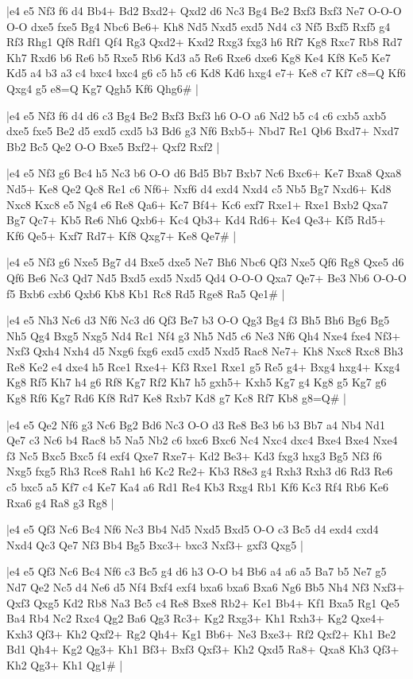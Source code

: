 \whitename{}
\blackname{}
\makegametitle
|e4 e5 Nf3 f6 d4 Bb4+ Bd2 Bxd2+ Qxd2 d6 Nc3 Bg4 Be2 Bxf3 Bxf3 Ne7 O-O-O O-O dxe5 fxe5 Bg4 Nbc6 Be6+ Kh8 Nd5 Nxd5 exd5 Nd4 c3 Nf5 Bxf5 Rxf5 g4 Rf3 Rhg1 Qf8 Rdf1 Qf4 Rg3 Qxd2+ Kxd2 Rxg3 fxg3 h6 Rf7 Kg8 Rxc7 Rb8 Rd7 Kh7 Rxd6 b6 Re6 b5 Rxe5 Rb6 Kd3 a5 Re6 Rxe6 dxe6 Kg8 Ke4 Kf8 Ke5 Ke7 Kd5 a4 b3 a3 c4 bxc4 bxc4 g6 c5 h5 c6 Kd8 Kd6 hxg4 e7+ Ke8 c7 Kf7 c8=Q Kf6 Qxg4 g5 e8=Q Kg7 Qgh5 Kf6 Qhg6\#  |

\whitename{}
\blackname{}
\makegametitle
|e4 e5 Nf3 f6 d4 d6 c3 Bg4 Be2 Bxf3 Bxf3 h6 O-O a6 Nd2 b5 c4 c6 cxb5 axb5 dxe5 fxe5 Be2 d5 exd5 cxd5 b3 Bd6 g3 Nf6 Bxb5+ Nbd7 Re1 Qb6 Bxd7+ Nxd7 Bb2 Bc5 Qe2 O-O Bxe5 Bxf2+ Qxf2 Rxf2  |

\whitename{}
\blackname{}
\makegametitle
|e4 e5 Nf3 g6 Bc4 h5 Nc3 b6 O-O d6 Bd5 Bb7 Bxb7 Nc6 Bxc6+ Ke7 Bxa8 Qxa8 Nd5+ Ke8 Qe2 Qc8 Re1 c6 Nf6+ Nxf6 d4 exd4 Nxd4 c5 Nb5 Bg7 Nxd6+ Kd8 Nxc8 Kxc8 e5 Ng4 e6 Re8 Qa6+ Kc7 Bf4+ Kc6 exf7 Rxe1+ Rxe1 Bxb2 Qxa7 Bg7 Qc7+ Kb5 Re6 Nh6 Qxb6+ Kc4 Qb3+ Kd4 Rd6+ Ke4 Qe3+ Kf5 Rd5+ Kf6 Qe5+ Kxf7 Rd7+ Kf8 Qxg7+ Ke8 Qe7\#  |

\whitename{}
\blackname{}
\makegametitle
|e4 e5 Nf3 g6 Nxe5 Bg7 d4 Bxe5 dxe5 Ne7 Bh6 Nbc6 Qf3 Nxe5 Qf6 Rg8 Qxe5 d6 Qf6 Be6 Nc3 Qd7 Nd5 Bxd5 exd5 Nxd5 Qd4 O-O-O Qxa7 Qe7+ Be3 Nb6 O-O-O f5 Bxb6 cxb6 Qxb6 Kb8 Kb1 Rc8 Rd5 Rge8 Ra5 Qe1\#  |

\whitename{}
\blackname{}
\makegametitle
|e4 e5 Nh3 Nc6 d3 Nf6 Nc3 d6 Qf3 Be7 b3 O-O Qg3 Bg4 f3 Bh5 Bh6 Bg6 Bg5 Nh5 Qg4 Bxg5 Nxg5 Nd4 Rc1 Nf4 g3 Nh5 Nd5 c6 Ne3 Nf6 Qh4 Nxe4 fxe4 Nf3+ Nxf3 Qxh4 Nxh4 d5 Nxg6 fxg6 exd5 cxd5 Nxd5 Rac8 Ne7+ Kh8 Nxc8 Rxc8 Bh3 Re8 Ke2 e4 dxe4 h5 Rce1 Rxe4+ Kf3 Rxe1 Rxe1 g5 Re5 g4+ Bxg4 hxg4+ Kxg4 Kg8 Rf5 Kh7 h4 g6 Rf8 Kg7 Rf2 Kh7 h5 gxh5+ Kxh5 Kg7 g4 Kg8 g5 Kg7 g6 Kg8 Rf6 Kg7 Rd6 Kf8 Rd7 Ke8 Rxb7 Kd8 g7 Kc8 Rf7 Kb8 g8=Q\#  |

\whitename{}
\blackname{}
\makegametitle
|e4 e5 Qe2 Nf6 g3 Nc6 Bg2 Bd6 Nc3 O-O d3 Re8 Be3 b6 b3 Bb7 a4 Nb4 Nd1 Qe7 c3 Nc6 b4 Rac8 b5 Na5 Nb2 c6 bxc6 Bxc6 Nc4 Nxc4 dxc4 Bxe4 Bxe4 Nxe4 f3 Nc5 Bxc5 Bxc5 f4 exf4 Qxe7 Rxe7+ Kd2 Be3+ Kd3 fxg3 hxg3 Bg5 Nf3 f6 Nxg5 fxg5 Rh3 Rce8 Rah1 h6 Kc2 Re2+ Kb3 R8e3 g4 Rxh3 Rxh3 d6 Rd3 Re6 c5 bxc5 a5 Kf7 c4 Ke7 Ka4 a6 Rd1 Re4 Kb3 Rxg4 Rb1 Kf6 Kc3 Rf4 Rb6 Ke6 Rxa6 g4 Ra8 g3 Rg8  |

\whitename{}
\blackname{}
\makegametitle
|e4 e5 Qf3 Nc6 Bc4 Nf6 Nc3 Bb4 Nd5 Nxd5 Bxd5 O-O c3 Bc5 d4 exd4 cxd4 Nxd4 Qc3 Qe7 Nf3 Bb4 Bg5 Bxc3+ bxc3 Nxf3+ gxf3 Qxg5  |

\whitename{}
\blackname{}
\makegametitle
|e4 e5 Qf3 Nc6 Bc4 Nf6 c3 Bc5 g4 d6 h3 O-O b4 Bb6 a4 a6 a5 Ba7 b5 Ne7 g5 Nd7 Qe2 Nc5 d4 Ne6 d5 Nf4 Bxf4 exf4 bxa6 bxa6 Bxa6 Ng6 Bb5 Nh4 Nf3 Nxf3+ Qxf3 Qxg5 Kd2 Rb8 Na3 Bc5 c4 Re8 Bxe8 Rb2+ Ke1 Bb4+ Kf1 Bxa5 Rg1 Qe5 Ba4 Rb4 Nc2 Rxc4 Qg2 Ba6 Qg3 Rc3+ Kg2 Rxg3+ Kh1 Rxh3+ Kg2 Qxe4+ Kxh3 Qf3+ Kh2 Qxf2+ Rg2 Qh4+ Kg1 Bb6+ Ne3 Bxe3+ Rf2 Qxf2+ Kh1 Be2 Bd1 Qh4+ Kg2 Qg3+ Kh1 Bf3+ Bxf3 Qxf3+ Kh2 Qxd5 Ra8+ Qxa8 Kh3 Qf3+ Kh2 Qg3+ Kh1 Qg1\#  |

